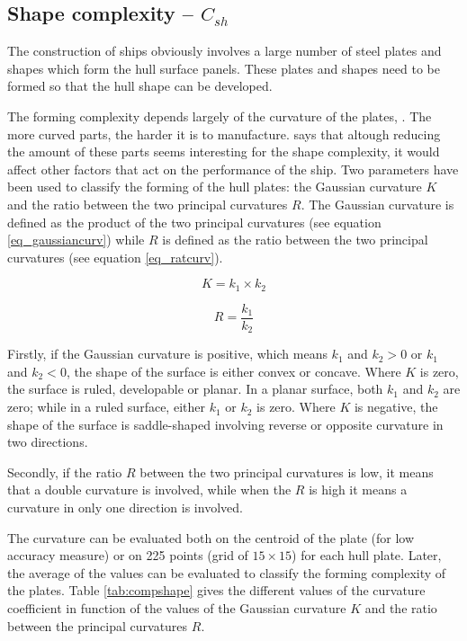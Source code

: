 \subsection{Shape complexity -- $C_{sh}$}
The construction of ships obviously involves a large number of steel plates and shapes which form the hull surface panels. These plates and shapes need to be formed so that the hull shape can be developed.


The forming complexity depends largely of the curvature of the plates, \cite{parsons1999scalar}. The more curved parts, the harder it is to manufacture. \cite{nam2012estimation} says that altough reducing the amount of these parts seems interesting for the shape complexity, it would affect other factors that act on the performance of the ship. Two parameters have been used to classify the forming of the hull plates: the Gaussian curvature $K$ and the ratio between the two principal curvatures $R$. The Gaussian curvature is defined as the product of the two principal curvatures (see equation \ref{eq_gaussiancurv}) while $R$ is defined as the ratio between the two principal curvatures (see equation \ref{eq_ratcurv}).
	
\begin{equation}
\label{eq_gaussiancurv}
K = k_1 \times k_2
\end{equation}
	
\begin{equation}
\label{eq_ratcurv}
R = \frac{k_1}{k_2}
\end{equation}
	
Firstly, if the Gaussian curvature is positive, which means $k_1$ and $k_2 > 0$ or $k_1$ and $k_2 < 0$, the shape of the surface is either convex or concave. Where $K$ is zero, the surface is ruled, developable or planar. In a planar surface, both $k_1$ and $k_2$ are zero; while in a ruled surface, either $k_1$ or $k_2$ is zero. Where $K$ is negative, the shape of the surface is saddle-shaped involving reverse or opposite curvature in two directions.


Secondly, if the ratio $R$ between the two principal curvatures is low, it means that a double curvature is involved, while when the $R$ is high it means a curvature in only one direction is involved.


The curvature can be evaluated both on the centroid of the plate (for low accuracy measure) or on 225 points (grid of $15 \times 15$) for each hull plate. Later, the average of the values can be evaluated to classify the forming complexity of the plates. Table \ref{tab:compshape} gives the different values of the curvature coefficient in function of the values of the Gaussian curvature $K$ and the ratio between the principal curvatures $R$.


